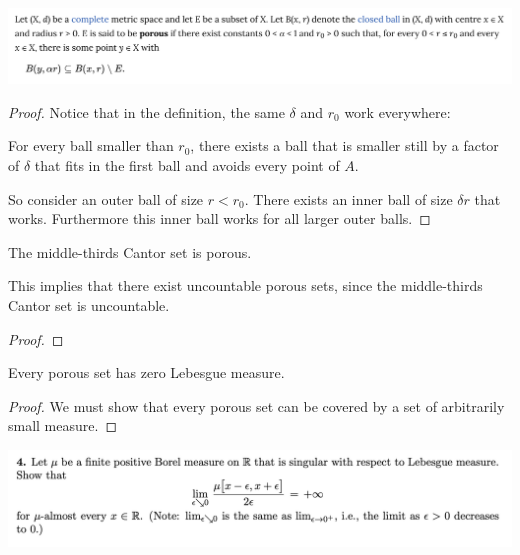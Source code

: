 \begin{mdframed}
\includegraphics[width=400pt]{img/analysis--berkeley-202a-final-b463.png}
\end{mdframed}

\begin{proof}

  Notice that in the definition, the same $\delta$ and $r_0$ work everywhere:

  For every ball smaller than $r_0$, there exists a ball that is smaller still by a factor of $\delta$ that
  fits in the first ball and avoids every point of $A$.

  So consider an outer ball of size $r < r_0$. There exists an inner ball of size $\delta r$ that works.
  Furthermore this inner ball works for all larger outer balls.
\end{proof}

\begin{claim}
  The middle-thirds Cantor set is porous.

  This implies that there exist uncountable porous sets, since the middle-thirds Cantor set is uncountable.
\end{claim}

\begin{proof}

\end{proof}

\begin{claim}
  Every porous set has zero Lebesgue measure.
\end{claim}

\begin{proof}
  We must show that every porous set can be covered by a set of arbitrarily small measure.
\end{proof}



\newpage
\begin{mdframed}
\includegraphics[width=400pt]{img/analysis--berkeley-202a-final-21a6.png}
\end{mdframed}

